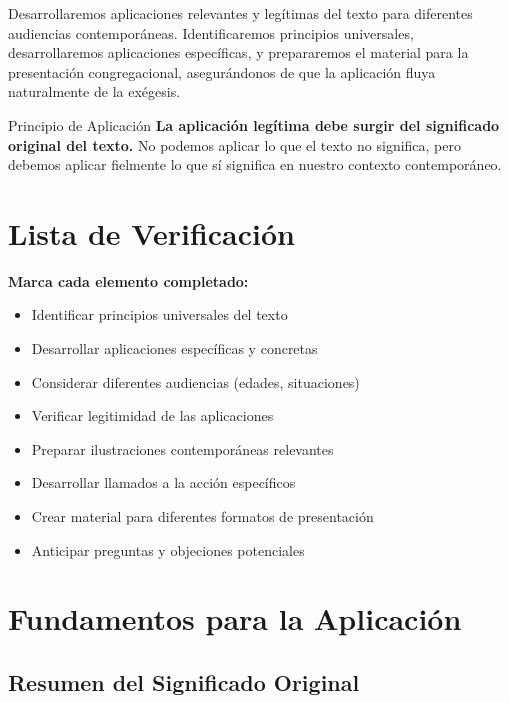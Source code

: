 \documentclass[11pt,a4paper]{article}
\begin{document}
Desarrollaremos aplicaciones relevantes y legítimas del texto para diferentes audiencias contemporáneas. Identificaremos principios universales, desarrollaremos aplicaciones específicas, y prepararemos el material para la presentación congregacional, asegurándonos de que la aplicación fluya naturalmente de la exégesis.

\begin{infobox}{Principio de Aplicación}
\textbf{La aplicación legítima debe surgir del significado original del texto.} No podemos aplicar lo que el texto no significa, pero debemos aplicar fielmente lo que sí significa en nuestro contexto contemporáneo.
\end{infobox}

\section{Lista de Verificación}

\begin{checklistbox}
\textbf{Marca cada elemento completado:}

\begin{itemize}[leftmargin=1cm]
    \item[$\square$] Identificar principios universales del texto
    \item[$\square$] Desarrollar aplicaciones específicas y concretas
    \item[$\square$] Considerar diferentes audiencias (edades, situaciones)
    \item[$\square$] Verificar legitimidad de las aplicaciones
    \item[$\square$] Preparar ilustraciones contemporáneas relevantes
    \item[$\square$] Desarrollar llamados a la acción específicos
    \item[$\square$] Crear material para diferentes formatos de presentación
    \item[$\square$] Anticipar preguntas y objeciones potenciales
\end{itemize}
\end{checklistbox}

\newpage

\section{Fundamentos para la Aplicación}

\subsection{Resumen del Significado Original}
\end{document}
